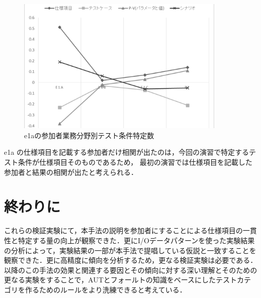 \documentclass[a4paper,12pt]{jreport}
\begin{document}
\begin{figure}[h]
  \begin{center}
  \includegraphics[width=10cm]{./image/D-3-Fig13.png}
  \caption{e1aの参加者業務分野別テスト条件特定数}
  \label{fig:D-3-Fig13}
  \end{center}
   \end{figure}

e1a の仕様項目を記載する参加者だけ相関が出たのは，今回の演習で特定するテスト条件が仕様項目そのものであるため， 最初の演習では仕様項目を記載した参加者と結果の相関が出たと考えられる．

\section{終わりに}
これらの検証実験にて，本手法の説明を参加者にすることによる仕様項目の一貫性と特定する量の向上が観察できた．更にI/Oデータパターンを使った実験結果の分析によって，実験結果の一部が本手法で提唱している仮説と一致することを観察できた．更に高精度に傾向を分析するため，更なる検証実験は必要である．以降のこの手法の効果と関連する要因とその傾向に対する深い理解とそのための更なる実験をすることで，AUTとフォールトの知識をベースにしたテストカテゴリを作るためのルールをより洗練できると考えている．
\end{document}
